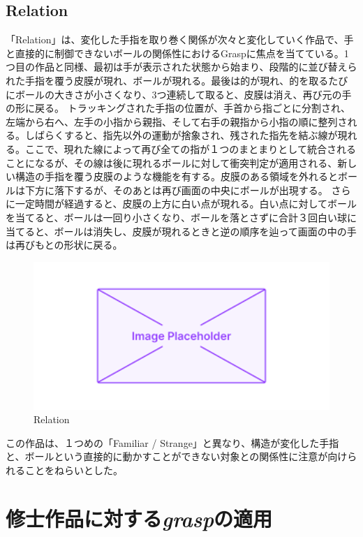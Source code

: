 \subsection*{Relation}
「Relation」は、変化した手指を取り巻く関係が次々と変化していく作品で、手と直接的に制御できないボールの関係性におけるGraspに焦点を当てている。1つ目の作品と同様、最初は手が表示された状態から始まり、段階的に並び替えられた手指を覆う皮膜が現れ、ボールが現れる。最後は的が現れ、的を取るたびにボールの大きさが小さくなり、3つ連続して取ると、皮膜は消え、再び元の手の形に戻る。
トラッキングされた手指の位置が、手首から指ごとに分割され、左端から右へ、左手の小指から親指、そして右手の親指から小指の順に整列される。しばらくすると、指先以外の運動が捨象され、残された指先を結ぶ線が現れる。ここで、現れた線によって再び全ての指が１つのまとまりとして統合されることになるが、その線は後に現れるボールに対して衝突判定が適用される、新しい構造の手指を覆う皮膜のような機能を有する。皮膜のある領域を外れるとボールは下方に落下するが、そのあとは再び画面の中央にボールが出現する。
さらに一定時間が経過すると、皮膜の上方に白い点が現れる。白い点に対してボールを当てると、ボールは一回り小さくなり、ボールを落とさずに合計３回白い球に当てると、ボールは消失し、皮膜が現れるときと逆の順序を辿って画面の中の手は再びもとの形状に戻る。
\begin{figure}[H]
  \centering
  \includegraphics[width=15cm]{img/placeholder.png}
  \caption{Relation}
  \label{fig:relation}
\end{figure}

この作品は、１つめの「Familiar / Strange」と異なり、構造が変化した手指と、ボールという直接的に動かすことができない対象との関係性に注意が向けられることをねらいとした。

\section{修士作品に対する\textit{grasp}の適用}
